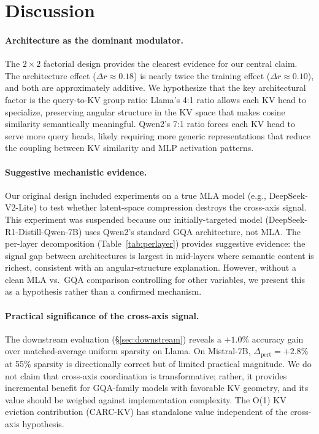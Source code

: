 \documentclass[11pt,a4paper]{article}
\begin{document}
\section{Discussion}
\label{sec:discussion}

\paragraph{Architecture as the dominant modulator.}
The $2\times 2$ factorial design provides the clearest evidence for our central claim.
The architecture effect ($\Delta r{\approx}0.18$) is nearly twice the training effect ($\Delta r{\approx}0.10$), and both are approximately additive.
We hypothesize that the key architectural factor is the query-to-KV group ratio: Llama's 4:1 ratio allows each KV head to specialize, preserving angular structure in the KV space that makes cosine similarity semantically meaningful.
Qwen2's 7:1 ratio forces each KV head to serve more query heads, likely requiring more generic representations that reduce the coupling between KV similarity and MLP activation patterns.

\paragraph{Suggestive mechanistic evidence.}
Our original design included experiments on a true MLA model (e.g., DeepSeek-V2-Lite) to test whether latent-space compression destroys the cross-axis signal.
This experiment was suspended because our initially-targeted model (DeepSeek-R1-Distill-Qwen-7B) uses Qwen2's standard GQA architecture, not MLA.
The per-layer decomposition (Table~\ref{tab:perlayer}) provides suggestive evidence: the signal gap between architectures is largest in mid-layers where semantic content is richest, consistent with an angular-structure explanation.
However, without a clean MLA vs.\ GQA comparison controlling for other variables, we present this as a hypothesis rather than a confirmed mechanism.

\paragraph{Practical significance of the cross-axis signal.}
The downstream evaluation (\S\ref{sec:downstream}) reveals a $+1.0\%$ accuracy gain over matched-average uniform sparsity on Llama.
On Mistral-7B, $\Delta_\text{pert}{=}{+}2.8\%$ at 55\% sparsity is directionally correct but of limited practical magnitude.
We do not claim that cross-axis coordination is transformative; rather, it provides incremental benefit for GQA-family models with favorable KV geometry, and its value should be weighed against implementation complexity.
The O(1) KV eviction contribution (CARC-KV) has standalone value independent of the cross-axis hypothesis.
\end{document}
